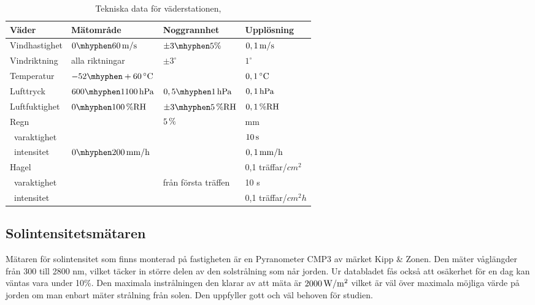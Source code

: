 \begin{table}[htdp]
\caption{Tekniska data för väderstationen, \cite{datasheet_weathertransmitter}}

\begin{center}
\begin{tabular}{|l | l l l|}
\hline
\textbf{Väder} & \textbf{Mätområde} %
 & \textbf{Noggrannhet} %
 & \textbf{Upplösning} \\ %
\hline
\rule{0pt}{3ex}Vindhastighet & $\unit[0\mhyphen 60]{m/s}$ & $\pm 3\mhyphen 5\%$ & $\unit[0,1]{m/s}$ \\ 
\rule{0pt}{3ex}Vindriktning & alla riktningar & $\pm 3^{\circ}$ & $1^{\circ}$ \\
\rule{0pt}{3ex}Temperatur & $\unit[-52\mhyphen +60]{^{\circ}C}$ & & $\unit[0,1]{^{\circ}C}$ \\
\rule{0pt}{3ex}Lufttryck & $\unit[600\mhyphen 1100]{hPa}$ & $\unit[0,5\mhyphen 1]{hPa}$ & $\unit[0,1]{hPa}$ \\
\rule{0pt}{3ex}Luftfuktighet & $\unit[0\mhyphen 100]{\%RH}$ & $\unit[\pm3\mhyphen 5]{\%RH}$ & $\unit[0,1]{\%RH}$ \\
\rule{0pt}{3ex}Regn &  & $\unit[5]{\%}$ & \unit[0,01]{mm} \\
~varaktighet & & & $\unit[10]{s}$\\
~intensitet & $\unit[0\mhyphen 200]{mm/h}$ & & $\unit[0,1]{mm/h}$ \\
\rule{0pt}{3ex}Hagel &  &  & 0,1 träffar/$\unit{cm^2}$ \\
~varaktighet & & från första träffen & 10 s\\
~intensitet & & & 0,1 träffar/$\unit{cm^2h}$\\
\hline
\end{tabular}
\end{center}
\label{tbl:weathertransmitter}
\end{table}

\subsection{Solintensitetsmätaren}\label{subsec:sunmeter}
Mätaren för solintensitet som finns monterad på fastigheten är en Pyranometer CMP3 av märket Kipp \& Zonen. Den mäter våglängder från 300 till 2800 nm, vilket täcker in större delen av den solstrålning som når jorden. Ur databladet fås också att osäkerhet för en dag kan väntas vara under 10\%. Den maximala instrålningen den klarar av att mäta är $\unit[2000]{W/m^2}$ vilket är väl över maximala möjliga värde på jorden om man enbart mäter strålning från solen. Den uppfyller gott och väl behoven för studien.\cite{datasheet_sun}



